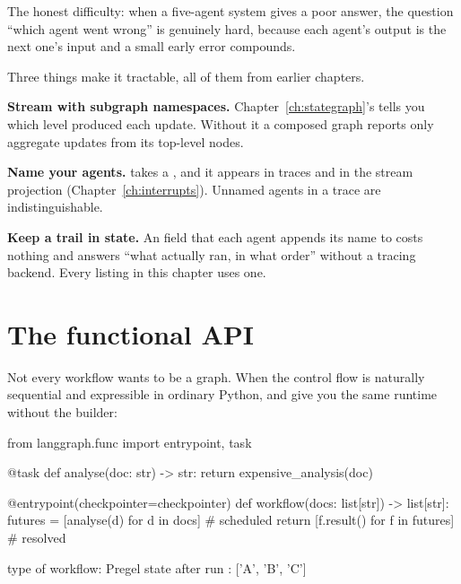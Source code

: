 The honest difficulty: when a five-agent system gives a poor answer, the question
``which agent went wrong'' is genuinely hard, because each agent's output is the
next one's input and a small early error compounds.

Three things make it tractable, all of them from earlier chapters.

\textbf{Stream with subgraph namespaces.} Chapter~\ref{ch:stategraph}'s
 tells you which level produced each update. Without it a
composed graph reports only aggregate updates from its top-level nodes.

\textbf{Name your agents.}  takes a , and it
appears in traces and in the  stream projection
(Chapter~\ref{ch:interrupts}). Unnamed agents in a trace are indistinguishable.

\textbf{Keep a trail in state.} An  field
that each agent appends its name to costs nothing and answers ``what actually
ran, in what order'' without a tracing backend. Every listing in this chapter
uses one.

\section{The functional API}
\label{sec:functional-api}

Not every workflow wants to be a graph. When the control flow is naturally
sequential and expressible in ordinary Python,  and 
give you the same runtime without the builder:

\begin{python}[caption={Same runtime, ordinary control flow}, label={lst:functional}]
from langgraph.func import entrypoint, task


@task
def analyse(doc: str) -> str:
    return expensive_analysis(doc)


@entrypoint(checkpointer=checkpointer)
def workflow(docs: list[str]) -> list[str]:
    futures = [analyse(d) for d in docs]      # scheduled
    return [f.result() for f in futures]      # resolved
\end{python}

\begin{console}
['A', 'B', 'C']
type of workflow: Pregel
state after run : ['A', 'B', 'C']
\end{console}

